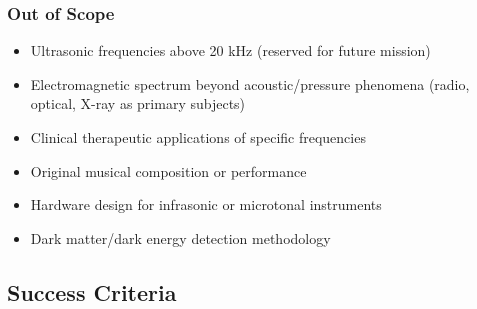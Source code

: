 \documentclass[11pt,letterpaper]{article}
\begin{document}
\subsubsection{Out of Scope}
\begin{itemize}[leftmargin=2em]
\item Ultrasonic frequencies above 20 kHz (reserved for future mission)
\item Electromagnetic spectrum beyond acoustic/pressure phenomena (radio, optical, X-ray as primary subjects)
\item Clinical therapeutic applications of specific frequencies
\item Original musical composition or performance
\item Hardware design for infrasonic or microtonal instruments
\item Dark matter/dark energy detection methodology
\end{itemize}

\subsection{Success Criteria}
\end{document}
